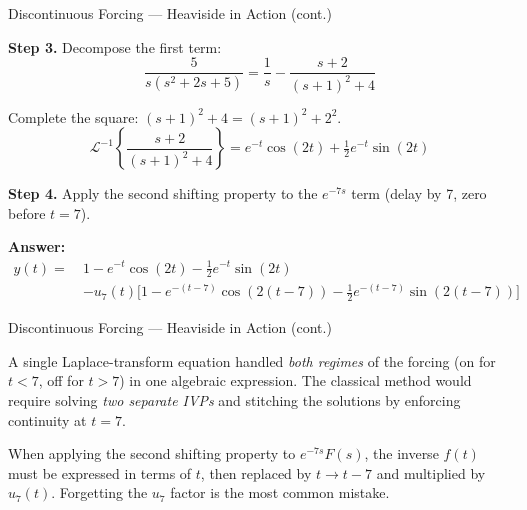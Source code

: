 \documentclass[aspectratio=169,11pt]{beamer}
\begin{document}
\begin{frame}{Discontinuous Forcing --- Heaviside in Action (cont.)}
\footnotesize
\begin{examplebox}[A Mass-Spring Switched Off at $t=7$ (cont.)]
\textbf{Step 3.} Decompose the first term:
\[\frac{5}{s(s^2+2s+5)} = \frac{1}{s} - \frac{s+2}{(s+1)^2+4}\]

Complete the square: $(s+1)^2 + 4 = (s+1)^2 + 2^2$.
\[\mathcal{L}^{-1}\!\left\{\frac{s+2}{(s+1)^2+4}\right\} = e^{-t}\cos(2t) + \tfrac{1}{2}e^{-t}\sin(2t)\]

\textbf{Step 4.} Apply the second shifting property to the $e^{-7s}$ term (delay by 7, zero before $t=7$).

\textbf{Answer:}
\begin{align*}
y(t) =\ & 1 - e^{-t}\cos(2t) - \tfrac{1}{2}e^{-t}\sin(2t) \\
& - u_7(t)\Big[1 - e^{-(t-7)}\cos(2(t-7)) - \tfrac{1}{2}e^{-(t-7)}\sin(2(t-7))\Big]
\end{align*}
\end{examplebox}
\end{frame}

\begin{frame}{Discontinuous Forcing --- Heaviside in Action (cont.)}
\footnotesize
\begin{conceptbox}
A single Laplace-transform equation handled \emph{both regimes} of the forcing (on for $t<7$, off for $t>7$) in one algebraic expression. The classical method would require solving \emph{two separate IVPs} and stitching the solutions by enforcing continuity at $t=7$.
\end{conceptbox}
\vspace{0.5mm}
\begin{warningbox}
When applying the second shifting property to $e^{-7s}F(s)$, the inverse $f(t)$ must be expressed in terms of $t$, then replaced by $t \to t-7$ and multiplied by $u_7(t)$. Forgetting the $u_7$ factor is the most common mistake.
\end{warningbox}
\end{frame}
\end{document}
